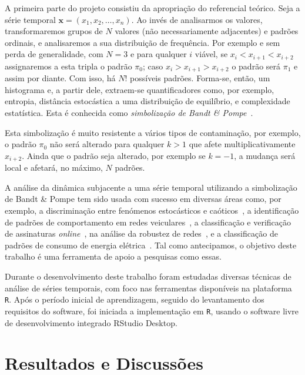 \documentclass[journal,a4paper,11pt]{IEEEtran}
\begin{document}
A primeira parte do projeto consistiu da apropriação do referencial teórico.
 Seja a série temporal $\bm x = (x_1, x_2, \dots, x_n)$.
 Ao invés de analisarmos os valores, transformaremos grupos de $N$ valores (não necessariamente adjacentes) e padrões ordinais, e analisaremos a sua distribuição de frequência.
 Por exemplo e sem perda de generalidade, com $N=3$ e para qualquer $i$ viável,
 se $x_i<x_{i+1}<x_{i+2}$ assignaremos a esta tripla o padrão $\pi_0$;
 caso $x_i>x_{i+1}>x_{i+2}$ o padrão será $\pi_1$ e assim por diante.
 Com isso, há $N!$ possíveis padrões.
 Forma-se, então, um histograma e, a partir dele, extraem-se quantificadores como, por exemplo, entropia, distância estocástica a uma distribuição de equilíbrio, e complexidade estatística.
 Esta é conhecida como \textit{simbolização de Bandt \& Pompe}~\cite{PermutationEntropyBandtPompe}.
 
 Esta simbolização é muito resistente a vários tipos de contaminação, por exemplo, o padrão $\pi_0$ não será alterado para qualquer $k>1$ que afete multiplicativamente $x_{i+2}$.
 Ainda que o padrão seja alterado, por exemplo se $k=-1$, a mudança será local e afetará, no máximo, $N$ padrões.
 
 A análise da dinâmica subjacente a uma série temporal utilizando a simbolização de Bandt \& Pompe tem sido usada com sucesso em diversas áreas como, por exemplo, 
 a discriminação entre fenómenos estocásticos e caóticos~\cite{DistinguishingNoiseFromChaos}, 
 a identificação de padrões de comportamento em redes veiculares~\cite{CharacterizationVehicleBehaviorInformationTheory},
 a classificação e verificação de assinaturas \textit{online}~\cite{ClassificationVerificationOnlineHandwrittenSignatures},
 na análise da robustez de redes~\cite{InformationTheoryPerspectiveNetworkRobustness},
 e a classificação de padrões de consumo de energia elétrica~\cite{CharacterizationElectricLoadInformationTheoryQuantifiers}.
 Tal como antecipamos, o objetivo deste trabalho é uma ferramenta de apoio a pesquisas como essas.
 
 Durante o desenvolvimento deste trabalho foram estudadas diversas técnicas de análise de séries temporais, com foco nas ferramentas disponíveis na plataforma \texttt R.
 Após o período inicial de aprendizagem, seguido do levantamento dos requisitos do software, foi iniciada a implementação em \texttt R, usando o software livre de desenvolvimento integrado RStudio Desktop.
    
\section*{\textbf{Resultados e Discussões}}
   
\end{document}
